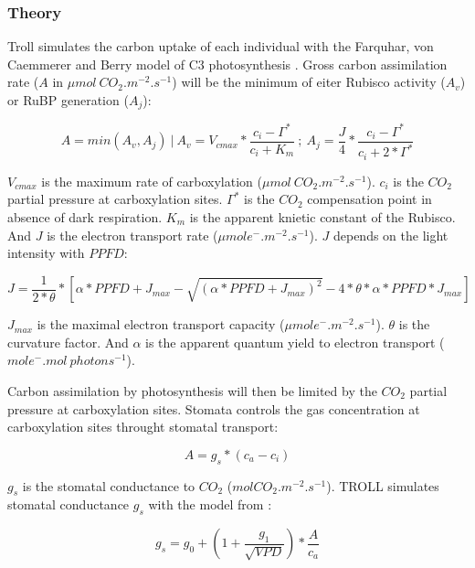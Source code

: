 \documentclass[]{article}
\theoremstyle{definition}
\theoremstyle{definition}
\theoremstyle{remark}
\begin{document}
\subsubsection{Theory}\label{theory}

Troll simulates the carbon uptake of each individual with the Farquhar,
von Caemmerer and Berry model of C3 photosynthesis \citep{Farquhar1980}.
Gross carbon assimilation rate (\(A\) in
\(\mu mol~CO_2. m^{-2}.s^{-1}\)) will be the minimum of eiter Rubisco
activity (\(A_v\)) or RuBP generation (\(A_j\)):

\begin{equation}
  A=min(A_v, A_j)~|~A_v=V_{cmax}*\frac{c_i-\Gamma^*}{c_i+K_m}~;~A_j=\frac{J}{4}*\frac{c_i-\Gamma^*}{c_i+2*\Gamma^*}
  \label{eq:A}
\end{equation}

\(V_{cmax}\) is the maximum rate of carboxylation
(\(\mu mol~CO_2.m^{-2}.s^{-1}\)). \(c_i\) is the \(CO_2\) partial
pressure at carboxylation sites. \(\Gamma^*\) is the \(CO_2\)
compensation point in absence of dark respiration. \(K_m\) is the
apparent knietic constant of the Rubisco. And \(J\) is the electron
transport rate (\(\mu mol e^-.m^{-2}.s^{-1}\)). \(J\) depends on the
light intensity with \(PPFD\):

\begin{equation}
  J = \frac{1}{2*\theta}*[\alpha*PPFD+J_{max}-\sqrt{(\alpha*PPFD+J_{max})^2}-4*\theta*\alpha*PPFD*J_{max}]
  \label{eq:J}
\end{equation}

\(J_{max}\) is the maximal electron transport capacity
(\(\mu mol e^-.m^{-2}.s^{-1}\)). \(\theta\) is the curvature factor. And
\(\alpha\) is the apparent quantum yield to electron transport
(\(mole^-.mol~photons^{-1}\)).

Carbon assimilation by photosynthesis will then be limited by the
\(CO_2\) partial pressure at carboxylation sites. Stomata controls the
gas concentration at carboxylation sites throught stomatal transport:

\begin{equation}
  A = g_s*(c_a-c_i)
  \label{eq:Ag}
\end{equation}

\(g_s\) is the stomatal conductance to \(CO_2\)
(\(molCO_2.m^{-2}.s^{-1}\)). TROLL simulates stomatal conductance
\(g_s\) with the model from \citep{Medlyn2011}:

\begin{equation}
  g_s = g_0 + (1 + \frac{g_1}{\sqrt{VPD}})*\frac{A}{c_a}
  \label{eq:gs}
\end{equation}
\end{document}
